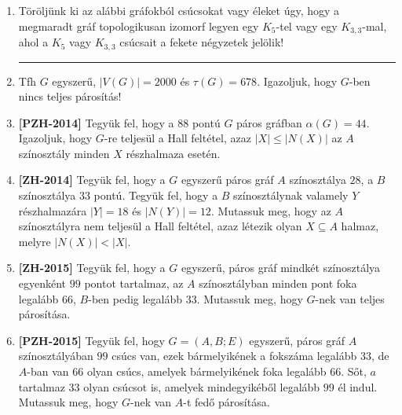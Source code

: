 \documentclass[a4paper, 12pt]{article}
\begin{document}
\begin{enumerate}
            \item Töröljünk ki az alábbi gráfokból csúcsokat vagy éleket úgy, hogy a megmaradt gráf topologikusan izomorf legyen egy $K_5$-tel vagy egy $K_{3,3}$-mal, ahol a $K_5$ vagy $K_{3,3}$ csúcsait a fekete négyzetek jelölik!
            \begin{figure}[ht]
                \centering
                \begin{subfigure}{0.2\textwidth}
                    \centering
                    
                \end{subfigure}
                \begin{subfigure}{0.2\textwidth}
                    \centering
                    
                \end{subfigure}
                \begin{subfigure}{0.2\textwidth}
                    \centering
                    
                \end{subfigure}
                \begin{subfigure}{0.2\textwidth}
                    \centering
                    
                \end{subfigure}
            \end{figure}
            \hrule
            \item Tfh $G$ egyszerű, $|V(G)|=2000$ és $\tau(G)=678$. Igazoljuk, hogy $G$-ben nincs teljes párosítás! 
            \item \textbf{[PZH-2014]} Tegyük fel, hogy a $88$ pontú $G$ páros gráfban $\alpha(G) = 44$. Igazoljuk, hogy $G$-re teljesül a Hall feltétel, azaz $|X| \leq |N(X)|$ az $A$ színosztály minden $X$ részhalmaza esetén.
            \item \textbf{[ZH-2014]} Tegyük fel, hogy a $G$ egyszerű páros gráf $A$ színosztálya $28$, a $B$ színosztálya $33$ pontú. Tegyük fel, hogy a $B$ színosztálynak valamely $Y$ részhalmazára $|Y|=18$ és $|N(Y)|=12$. Mutassuk meg, hogy az $A$ színosztályra nem teljesül a Hall feltétel, azaz létezik olyan $X \subseteq A$ halmaz, melyre $|N(X)| < |X|$.
            \item \textbf{[ZH-2015]} Tegyük fel, hogy a $G$ egyszerű, páros gráf mindkét színosztálya egyenként $99$ pontot tartalmaz, az $A$ színosztályban minden pont foka legalább $66$, $B$-ben pedig legalább $33$. Mutassuk meg, hogy $G$-nek van teljes párosítása.
            \item \textbf{[PZH-2015]} Tegyük fel, hogy $G=(A,B;E)$ egyszerű, páros gráf $A$ színosztályában $99$ csúcs van, ezek bármelyikének a fokszáma legalább $33$, de $A$-ban van $66$ olyan csúcs, amelyek bármelyikének foka legalább $66$. Sőt, $a$ tartalmaz $33$ olyan csúcsot is, amelyek mindegyikéből legalább $99$ él indul. Mutassuk meg, hogy $G$-nek van $A$-t fedő párosítása.

\end{enumerate}
\end{document}

